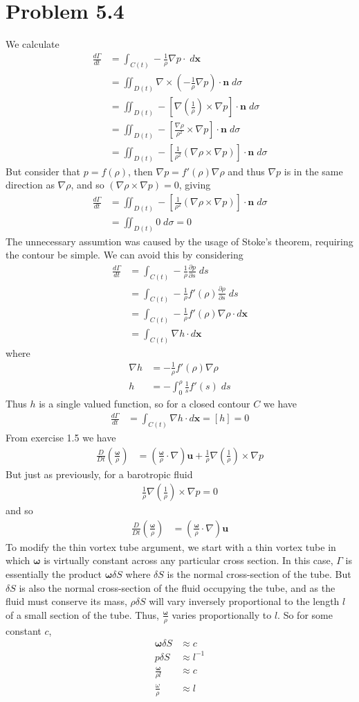 \documentclass[12pt]{article}
\newcommand{\eq}[1]{\begin{align*}#1\end{align*}}
\newcommand{\p}[2]{\frac{\partial#1}{\partial#2}}
\newcommand{\de}[2]{\frac{d#1}{d#2}}
\newcommand{\De}[2]{\frac{D#1}{D#2}}
\begin{document}
\section*{Problem 5.4}
We calculate
\eq{
	\de{\Gamma}{t} &= \int_{C(t)} -\frac{1}{\rho}\nabla p \cdot\;d\bm{x}\\
	&= \iint_{D(t)} \nabla \times (-\frac{1}{\rho}\nabla p)\cdot \bm{n}\;d\sigma\\
	&= \iint_{D(t)} -\left[\nabla(\frac{1}{\rho}) \times \nabla p\right]\cdot \bm{n}\;d\sigma\\
	&= \iint_{D(t)} -\left[\frac{\nabla \rho}{\rho^2} \times \nabla p\right]\cdot \bm{n}\;d\sigma\\
	&= \iint_{D(t)} -\left[\frac{1}{\rho^2}(\nabla \rho \times \nabla p)\right]\cdot \bm{n}\;d\sigma
}
But consider that $p = f(\rho)$, then $\nabla p = f'(\rho)\nabla\rho$ and thus $\nabla p$ is in the same direction as $\nabla \rho$, and so $(\nabla \rho \times \nabla p) = 0$, giving
\eq{
	\de{\Gamma}{t} &= \iint_{D(t)} -\left[\frac{1}{\rho^2}(\nabla \rho \times \nabla p)\right]\cdot \bm{n}\;d\sigma\\
	&= \iint_{D(t)} 0 \; d\sigma = 0
}
The unnecessary assumtion was caused by the usage of Stoke's theorem, requiring the contour be simple. We can avoid this by considering
\eq{
	\de{\Gamma}{t} &= \int_{C(t)} -\frac{1}{\rho} \p{p}{s}\;ds\\
	&= \int_{C(t)} -\frac{1}{\rho}f'(\rho)\p{\rho}{s}\;ds\\
	&= \int_{C(t)} -\frac{1}{\rho}f'(\rho)\nabla\rho\cdot d\bm{x}\\
	&= \int_{C(t)} \nabla h \cdot d\bm{x}
}
where
\eq{
	\nabla h &= -\frac{1}{\rho}f'(\rho)\nabla\rho\\
	h &= -\int_0^\rho \frac{1}{s}f'(s)\;ds
}
Thus $h$ is a single valued function, so for a closed contour $C$ we have
\eq{
	\de{\Gamma}{t} &= \int_{C(t)} \nabla h \cdot d\bm{x} = [h] = 0
}
From exercise 1.5 we have
\eq{
	\De{}{t}\left(\frac{\bm{\omega}}{\rho}\right) &= \left(\frac{\bm{\omega}}{\rho} \cdot \nabla\right)\bm{u} + \frac{1}{\rho}\nabla\left(\frac{1}{\rho}\right)\times\nabla p
}
But just as previously, for a barotropic fluid
\eq{
	\frac{1}{\rho}\nabla\left(\frac{1}{\rho}\right)\times\nabla p = 0
}
and so
\eq{
	\De{}{t}\left(\frac{\bm{\omega}}{\rho}\right) &= \left(\frac{\bm{\omega}}{\rho} \cdot \nabla\right)\bm{u}
}
To modify the thin vortex tube argument, we start with a thin vortex
tube in which $\bm{\omega}$ is virtually constant across any
particular cross section. In this case, $\Gamma$ is essentially the
product $\bm{\omega}\delta S$ where $\delta S$ is the normal
cross-section of the tube. But $\delta S$ is also the normal
cross-section of the fluid occupying the tube, and as the fluid must
conserve its mass, $\rho\delta S$ will vary inversely proportional
to the length $l$ of a small section of the tube. Thus, 
$\frac{\bm{\omega}}{\rho}$ varies proportionally to $l$.
So for some constant $c$,
\eq{
	\bm{\omega}\delta S &\approx c\\
	p\delta S &\approx l^{-1}\\
	\frac{\bm{\omega}}{\rho l} &\approx c\\
	\frac{\omega}{\rho} &\approx l
}
\end{document}
